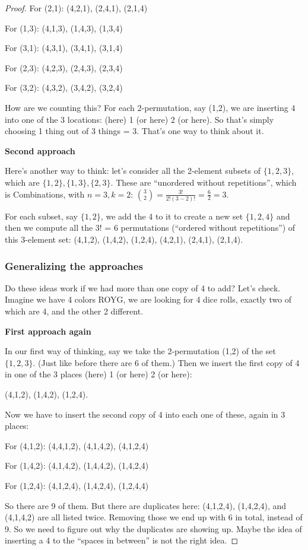 \documentclass[14pt]{extarticle}
\begin{document}
\begin{proof}
For (2,1): (4,2,1), (2,4,1), (2,1,4)

For (1,3): (4,1,3), (1,4,3), (1,3,4)

For (3,1): (4,3,1), (3,4,1), (3,1,4)

For (2,3): (4,2,3), (2,4,3), (2,3,4)

For (3,2): (4,3,2), (3,4,2), (3,2,4)

How are we counting this? For each 2-permutation, say (1,2), we are inserting 4 into one of the 3 locations: (here) 1 (or here) 2 (or here). So that's simply choosing 1 thing out of 3 things = 3. That's one way to think about it. 

{\bf Second approach}

Here's another way to think: let's consider all the 2-element subsets of $\{1, 2, 3\}$, which are $\{1,2\}, \{1,3\}, \{2,3\}$. These are ``unordered without repetitions'', which is Combinations, with $n = 3, k = 2$: $\binom{3}{2} = \frac{3!}{2!(3-2)!} = \frac{6}{2} = 3$.

For each subset, say $\{1,2\}$, we add the 4 to it to create a new set $\{1,2,4\}$ and then we compute all the 3! = 6 permutations (``ordered without repetitions'') of this 3-element set: (4,1,2), (1,4,2), (1,2,4), (4,2,1), (2,4,1), (2,1,4).

\subsubsection{Generalizing the approaches}
Do these ideas work if we had more than one copy of 4 to add? Let's check. Imagine we have 4 colors ROYG, we are looking for 4 dice rolls, exactly two of which are 4, and the other 2 different.

{\bf First approach again}

In our first way of thinking, say we take the 2-permutation (1,2) of the set $\{1,2,3\}$. (Just like before there are 6 of them.) Then we insert the first copy of 4 in one of the 3 places (here) 1 (or here) 2 (or here):

(4,1,2), (1,4,2), (1,2,4).

Now we have to insert the second copy of 4 into each one of these, again in 3 places:

For (4,1,2): (4,4,1,2), (4,1,4,2), (4,1,2,4)

For (1,4,2): (4,1,4,2), (1,4,4,2), (1,4,2,4)

For (1,2,4): (4,1,2,4), (1,4,2,4), (1,2,4,4)

So there are 9 of them. But there are duplicates here: (4,1,2,4), (1,4,2,4), and (4,1,4,2) are all listed twice. Removing those we end up with 6 in total, instead of 9. So we need to figure out why the duplicates are showing up. Maybe the idea of inserting a 4 to the ``spaces in between'' is not the right idea.


\end{proof}
\end{document}
